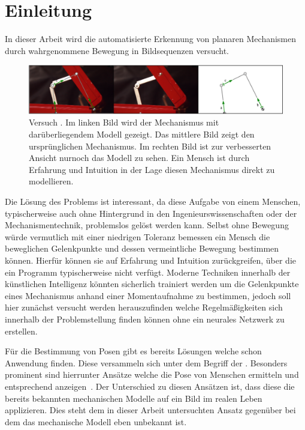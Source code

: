 %

\chapter{Einleitung}
\label{ch:einleitung}

In dieser Arbeit wird die automatisierte Erkennung von planaren Mechanismen durch wahrgenommene Bewegung in Bildsequenzen versucht.

\begin{figure}
\centering
    \includegraphics[width=\textwidth]{gfx/werkzeugkoffer_impl.png}
    \caption[Versuch ]{Versuch . Im linken Bild wird der Mechanismus mit darüberliegendem  Modell gezeigt. Das mittlere Bild zeigt den ursprünglichen Mechanismus. Im rechten Bild ist zur verbesserten Ansicht nurnoch das  Modell zu sehen. Ein Mensch ist durch Erfahrung und Intuition in der Lage diesen Mechanismus direkt zu modellieren.}
    \label{fig:werkzeugkoffer_impl}
\end{figure}

Die Lösung des Problems ist interessant, da diese Aufgabe von einem Menschen, typischerweise auch ohne Hintergrund in den Ingenieurswissenschaften oder der Mechanismentechnik, problemslos gelöst werden kann.
Selbst ohne Bewegung würde vermutlich mit einer niedrigen Toleranz bemessen ein Mensch die beweglichen Gelenkpunkte und dessen vermeintliche Bewegung bestimmen können.
Hierfür können sie auf Erfahrung und Intuition zurückgreifen, über die ein Programm typischerweise nicht verfügt.
Moderne Techniken innerhalb der künstlichen Intelligenz könnten sicherlich trainiert werden um die Gelenkpunkte eines Mechanismus anhand einer Momentaufnahme zu bestimmen, jedoch soll hier zunächst versucht werden herauszufinden welche Regelmä{\ss}igkeiten sich innerhalb der Problemstellung finden können ohne ein neurales Netzwerk zu erstellen.

Für die Bestimmung von Posen gibt es bereits Lösungen welche schon Anwendung finden.
Diese versammeln sich unter dem Begriff der .
Besonders prominent sind hierrunter Ansätze welche die Pose von Menschen ermitteln und entsprechend anzeigen~\cite{Papandreou2018, Google2021, Google2021a}.
Der Unterschied zu diesen Ansätzen ist, dass diese die bereits bekannten mechanischen Modelle auf ein Bild im realen Leben applizieren.
Dies steht dem in dieser Arbeit untersuchten Ansatz gegenüber bei dem das mechanische Modell eben unbekannt ist.

